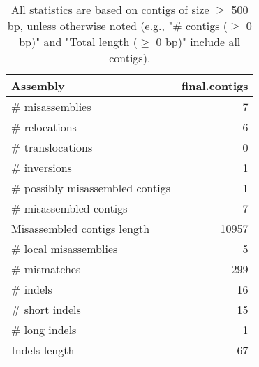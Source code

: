 \documentclass[12pt,a4paper]{article}
\begin{document}
\begin{table}[ht]
\begin{center}
\caption{All statistics are based on contigs of size $\geq$ 500 bp, unless otherwise noted (e.g., "\# contigs ($\geq$ 0 bp)" and "Total length ($\geq$ 0 bp)" include all contigs).}
\begin{tabular}{|l*{1}{|r}|}
\hline
Assembly & final.contigs \\ \hline
\# misassemblies & 7 \\ \hline
\hspace{5mm}\# relocations & 6 \\ \hline
\hspace{5mm}\# translocations & 0 \\ \hline
\hspace{5mm}\# inversions & 1 \\ \hline
\# possibly misassembled contigs & 1 \\ \hline
\# misassembled contigs & 7 \\ \hline
Misassembled contigs length & 10957 \\ \hline
\# local misassemblies & 5 \\ \hline
\# mismatches & 299 \\ \hline
\# indels & 16 \\ \hline
\hspace{5mm}\# short indels & 15 \\ \hline
\hspace{5mm}\# long indels & 1 \\ \hline
Indels length & 67 \\ \hline
\end{tabular}
\end{center}
\end{table}
\end{document}

